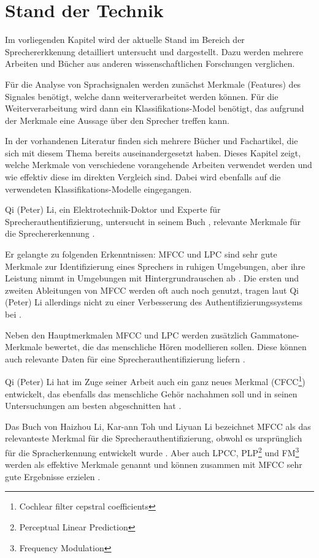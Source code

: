 \section{Stand der Technik} \label{sec:StandDerTechnik}
Im vorliegenden Kapitel wird der aktuelle Stand im Bereich der Sprechererkkenung detailliert untersucht und dargestellt.
Dazu werden mehrere Arbeiten und Bücher aus anderen wissenschaftlichen Forschungen verglichen.

Für die Analyse von Sprachsignalen werden zunächst Merkmale (Features) des Signales benötigt, welche dann weiterverarbeitet werden können.
Für die Weiterverarbeitung wird dann ein Klassifikations-Model benötigt, das aufgrund der Merkmale eine Aussage über den Sprecher treffen kann.

In der vorhandenen Literatur finden sich mehrere Bücher und Fachartikel, die sich mit diesem Thema bereits auseinandergesetzt haben. 
Dieses Kapitel zeigt, welche Merkmale von verschiedene vorangehende Arbeiten verwendet werden und wie effektiv diese im direkten Vergleich sind. Dabei wird ebenfalls auf die verwendeten Klassifikations-Modelle eingegangen.

Qi (Peter) Li, ein Elektrotechnik-Doktor und Experte für Sprecherauthentifizierung, untersucht in seinem Buch , relevante Merkmale für die Sprechererkennung \autocite{li_speaker_2012}.

Er gelangte zu folgenden Erkenntnissen:
\ac{MFCC} und \ac{LPC} sind sehr gute Merkmale zur Identifizierung eines Sprechers in ruhigen Umgebungen, aber ihre Leistung nimmt in Umgebungen mit Hintergrundrauschen ab \autocite[vgl.][S. 136]{li_speaker_2012}.
Die ersten und zweiten Ableitungen von \ac{MFCC} werden oft auch noch genutzt, tragen laut Qi (Peter) Li allerdings nicht zu einer Verbesserung des Authentifizierungssystems bei \autocite[vgl.][S. 143]{li_speaker_2012}.

Neben den Hauptmerkmalen \ac{MFCC} und \ac{LPC} werden zusätzlich Gammatone-Merkmale bewertet, die das menschliche Hören modellieren sollen.
Diese können auch relevante Daten für eine Sprecherauthentifizierung liefern \autocite[vgl.][S. 111, 117]{li_speaker_2012}.

Qi (Peter) Li hat im Zuge seiner Arbeit auch ein ganz neues Merkmal (CFCC\footnote{Cochlear filter cepstral coefficients}) entwickelt, das ebenfalls das menschliche Gehör nachahmen soll und in seinen Untersuchungen am besten abgeschnitten hat \autocite[vgl.][S. 135]{li_speaker_2012}.

Das Buch  von Haizhou Li, Kar-ann Toh und Liyuan Li bezeichnet \ac{MFCC} als das relevanteste Merkmal für die Sprecherauthentifizierung, obwohl es ursprünglich für die Spracherkennung entwickelt wurde \autocite[vgl.][S. 7, 51]{li_advanced_2011}.
Aber auch \ac{LPCC}, PLP\footnote{Perceptual Linear Prediction} und FM\footnote{Frequency Modulation} werden als effektive Merkmale genannt und können zusammen mit \ac{MFCC} sehr gute Ergebnisse erzielen \autocite[vgl.][S. 6, 67]{li_advanced_2011}.

